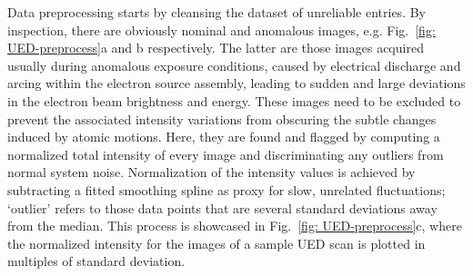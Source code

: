 Data preprocessing starts by cleansing the dataset of unreliable entries.
%
By inspection, there are obviously nominal and anomalous images,
e.g. Fig.~\ref{fig: UED-preprocess}a and b respectively.
%
The latter are those images acquired usually during anomalous exposure conditions,
caused by electrical discharge and arcing within the electron source assembly,
leading to sudden and large deviations in the electron beam brightness and energy.
These images need to be excluded to prevent the associated intensity variations
from obscuring the subtle changes induced by atomic motions.
%
Here, they are found and flagged by computing a normalized total intensity of every image
and discriminating any outliers from normal system noise.
Normalization of the intensity values is achieved by
subtracting a fitted smoothing spline as proxy for slow, unrelated fluctuations;
`outlier' refers to those data points
that are several standard deviations away from the median.
This process is showcased in Fig.~\ref{fig: UED-preprocess}c,
where the normalized intensity for the images of a sample UED scan is plotted
in multiples of standard deviation.

